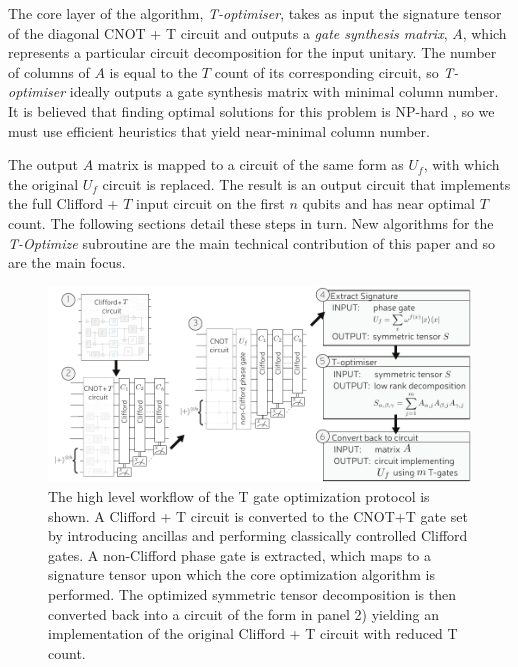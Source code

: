 \documentclass[notitlepage]{article}
\theoremstyle{definition}
\theoremstyle{problem}
\theoremstyle{lemma}
\begin{document}
The core layer of the algorithm, \emph{T-optimiser}, takes as input the signature tensor of the diagonal CNOT + T circuit and outputs a \emph{gate synthesis matrix}, $A$, which represents a particular circuit decomposition for the input unitary. The number of columns of $A$ is equal to the $T$ count of its corresponding circuit, so \emph{T-optimiser} ideally outputs a gate synthesis matrix with minimal column number. It is believed that finding optimal solutions for this problem is NP-hard \cite{3_Amy_2016}, so we must use efficient heuristics that yield near-minimal column number.

The output $A$ matrix is mapped to a circuit of the same form as $U_f$, with which the original $U_f$ circuit is replaced. The result is an output circuit that implements the full Clifford + $T$ input circuit on the first $n$ qubits and has near optimal $T$ count.
The following sections detail these steps in turn. New algorithms for the \emph{T-Optimize} subroutine are the main technical contribution of this paper and so are the main focus.

\begin{figure}[h!]		
			\includegraphics{Overview3}
			\caption{The high level workflow of the T gate optimization protocol is shown. A Clifford + T circuit is converted to the CNOT+T gate set by introducing ancillas and performing classically controlled Clifford gates. A non-Clifford phase gate is extracted, which maps to a signature tensor upon which the core optimization algorithm is performed. The optimized symmetric tensor decomposition is then converted back into a circuit of the form in panel 2) yielding an implementation of the original Clifford + T circuit with reduced T count. }
			\label{fig_overview}
		\end{figure}
\end{document}

